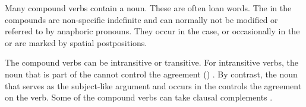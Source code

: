 Many compound verbs contain a noun. These  are often loan words. The  in the compounds are non-specific indefinite and can normally not be modified or referred to by anaphoric pronouns. They occur in the  case, or occasionally in the  or are marked by spatial postpositions.

The compound verbs can be intransitive or transitive. For intransitive verbs, the noun that is part of the  cannot control the agreement () . By contrast, the noun that serves as the subject-like argument and occurs in the  controls the  agreement on the verb. Some of the compound verbs can take clausal complements .

